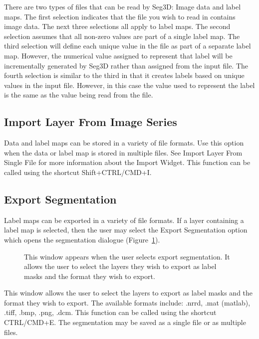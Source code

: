 \documentclass[fleqn,11pt,openany]{book}
\begin{document}
There are two types of files that can be read by Seg3D: Image data and label maps.  The first selection indicates that the file you wish to read in contains image data.  The next three selections all apply to label maps.  The second selection assumes that all non-zero values are part of a single label map.  The third selection will define each unique value in the file as part of a separate label map. However, the numerical value assigned to represent that label will be incrementally generated by Seg3D rather than assigned from the input file. The fourth selection is similar to the third in that it creates labels based on unique values in the input file.  However, in this case the value used to represent the label is the same as the value being read from the file.

\subsection{Import Layer From Image Series}
Data and label maps can be stored in a variety of file formats.  Use this option when the data or label map is stored in multiple files. See Import Layer From Single File for more information about the Import Widget. This function can be called using the shortcut Shift+CTRL/CMD+I.

\subsection{Export Segmentation}
Label maps can be exported in a variety of file formats.  If a layer containing a label map is selected, then the user may select the Export Segmentation option which opens the segmentation dialogue (Figure~\ref{fig:ExportSeg}).

\begin{figure}[h!]
\caption{This window appears when the user selects export segmentation.  It allows the user to select the layers they wish to export as label masks and the format they wish to export.}\label{fig:ExportSeg}
\end{figure}

This window allows the user to select the layers to export as label masks and the format they wish to export.  The available formats include: .nrrd, .mat (matlab), .tiff, .bmp, .png, .dcm. This function can be called using the shortcut CTRL/CMD+E.  The segmentation may be saved as a single file or as multiple files.  
\end{document}
